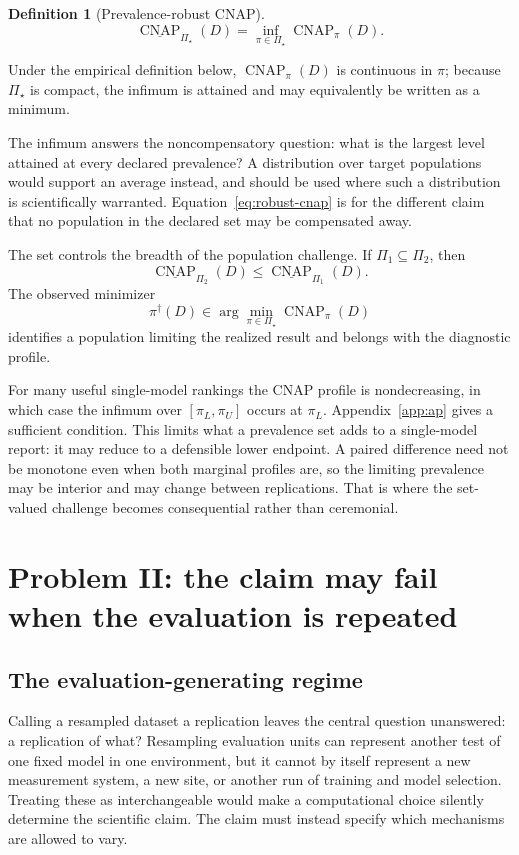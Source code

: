 \documentclass[11pt]{article}
\newcommand{\CNAP}{\operatorname{CNAP}}
\newcommand{\PSet}{\Pi_\star}
\newcommand{\RobCNAP}{\underline{\CNAP}_{\PSet}}
\newtheorem{definition}{Definition}
\theoremstyle{remark}
\begin{document}
\begin{definition}[Prevalence-robust CNAP]
\begin{equation}
\RobCNAP(D)
=
\inf_{\pi\in\PSet}\CNAP_\pi(D).
\label{eq:robust-cnap}
\end{equation}
\end{definition}

Under the empirical definition below, $\CNAP_\pi(D)$ is continuous in $\pi$; because $\PSet$ is compact, the infimum is attained and may equivalently be written as a minimum.

The infimum answers the noncompensatory question: what is the largest level attained at every declared prevalence? A distribution over target populations would support an average instead, and should be used where such a distribution is scientifically warranted. Equation~\eqref{eq:robust-cnap} is for the different claim that no population in the declared set may be compensated away.

The set controls the breadth of the population challenge. If $\Pi_1\subseteq\Pi_2$, then
\[
\underline{\CNAP}_{\Pi_2}(D)
\leq
\underline{\CNAP}_{\Pi_1}(D).
\]
The observed minimizer
\[
\pi^\dagger(D)\in
\arg\min_{\pi\in\PSet}\CNAP_\pi(D)
\]
identifies a population limiting the realized result and belongs with the diagnostic profile.

For many useful single-model rankings the CNAP profile is nondecreasing, in which case the infimum over $[\pi_L,\pi_U]$ occurs at $\pi_L$. Appendix~\ref{app:ap} gives a sufficient condition. This limits what a prevalence set adds to a single-model report: it may reduce to a defensible lower endpoint. A paired difference need not be monotone even when both marginal profiles are, so the limiting prevalence may be interior and may change between replications. That is where the set-valued challenge becomes consequential rather than ceremonial.

\section{Problem II: the claim may fail when the evaluation is repeated}
\label{sec:regime}

\subsection{The evaluation-generating regime}

Calling a resampled dataset a replication leaves the central question unanswered: a replication of what? Resampling evaluation units can represent another test of one fixed model in one environment, but it cannot by itself represent a new measurement system, a new site, or another run of training and model selection. Treating these as interchangeable would make a computational choice silently determine the scientific claim. The claim must instead specify which mechanisms are allowed to vary.
\end{document}
